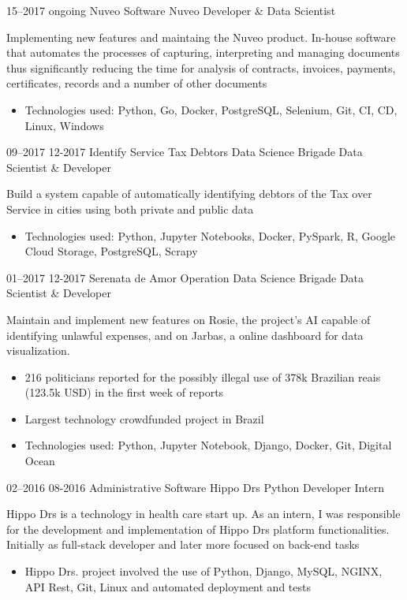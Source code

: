 \documentclass[]{friggeri-cv}
\begin{document}
\begin{entrylist}
  \entrysecondtype
    {15–2017 ongoing}
    {Nuveo Software}
    {Nuveo}
    {Developer \& Data Scientist}
    {Implementing new features and maintaing the Nuveo product. In-house software that automates the processes of capturing, interpreting and managing documents thus significantly reducing the time for analysis of contracts, invoices, payments, certificates, records and a number of other documents
      \begin{itemize}
        \item Technologies used: Python, Go, Docker, PostgreSQL, Selenium, Git, CI, CD, Linux, Windows
      \end{itemize}
    }
  \entrysecondtype
    {09–2017 12-2017}
    {Identify Service Tax Debtors}
    {Data Science Brigade}
    {Data Scientist \& Developer}
    {Build a system capable of automatically identifying debtors of the Tax over Service in cities using both private and public data
      \begin{itemize}
        \item Technologies used: Python, Jupyter Notebooks, Docker, PySpark, R, Google Cloud Storage, PostgreSQL, Scrapy
      \end{itemize}
    }
  \entrysecondtype
    {01–2017 12-2017}
    {Serenata de Amor Operation}
    {Data Science Brigade}
    {Data Scientist \& Developer}
    {Maintain and implement new features on Rosie, the project's AI capable of identifying unlawful expenses, and on Jarbas, a online dashboard for data visualization.
      \begin{itemize}
        \item 216 politicians reported for the possibly illegal use of 378k Brazilian reais (123.5k USD) in the first week of reports
        \item Largest technology crowdfunded project in Brazil
        \item Technologies used: Python, Jupyter Notebook, Django, Docker, Git, Digital Ocean
      \end{itemize}
    }
  \entrysecondtype
    {02–2016 08-2016}
    {Administrative Software}
    {Hippo Drs}
    {Python Developer Intern}
    {Hippo Drs is a technology in health care start up. As an intern, I was responsible for the development and implementation of Hippo Drs platform functionalities. Initially as full-stack developer and later more focused on back-end tasks
      \begin{itemize}
        \item Hippo Drs. project involved the use of Python, Django, MySQL, NGINX, API Rest, Git, Linux and automated deployment and tests
      \end{itemize}
    }
\end{entrylist}
\end{document}
